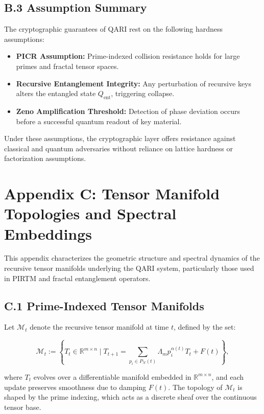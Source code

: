 \documentclass[12pt]{article}
\begin{document}
\begin{itemize}
\subsection*{B.3 Assumption Summary}

The cryptographic guarantees of QARI rest on the following hardness assumptions:

\begin{itemize}
    \item \textbf{PICR Assumption:} Prime-indexed collision resistance holds for large primes and fractal tensor spaces.
    \item \textbf{Recursive Entanglement Integrity:} Any perturbation of recursive keys alters the entangled state \(Q_{\text{ent}}\), triggering collapse.
    \item \textbf{Zeno Amplification Threshold:} Detection of phase deviation occurs before a successful quantum readout of key material.
\end{itemize}

Under these assumptions, the cryptographic layer offers resistance against classical and quantum adversaries without reliance on lattice hardness or factorization assumptions.

\section*{Appendix C: Tensor Manifold Topologies and Spectral Embeddings}

This appendix characterizes the geometric structure and spectral dynamics of the recursive tensor manifolds underlying the QARI system, particularly those used in PIRTM and fractal entanglement operators.

\subsection*{C.1 Prime-Indexed Tensor Manifolds}

Let \(\mathcal{M}_t\) denote the recursive tensor manifold at time \(t\), defined by the set:

\[
\mathcal{M}_t := \left\{ T_t \in \mathbb{R}^{m \times n} \mid T_{t+1} = \sum_{p_i \in P_N(t)} \Lambda_m p_i^{\alpha(t)} T_t + F(t) \right\},
\]

where \(T_t\) evolves over a differentiable manifold embedded in \(\mathbb{R}^{m \times n}\), and each update preserves smoothness due to damping \(F(t)\). The topology of \(\mathcal{M}_t\) is shaped by the prime indexing, which acts as a discrete sheaf over the continuous tensor base.


\end{itemize}
\end{document}
